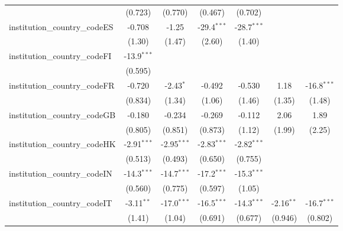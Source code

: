 \begin{tabular}{lcccccc}
                                         & (0.723)       & (0.770)       & (0.467)       & (0.702)       &               &   \\   
   institution\_country\_codeES          & -0.708        & -1.25         & -29.4$^{***}$ & -28.7$^{***}$ &               &   \\   
                                         & (1.30)        & (1.47)        & (2.60)        & (1.40)        &               &   \\   
   institution\_country\_codeFI          & -13.9$^{***}$ &               &               &               &               &   \\   
                                         & (0.595)       &               &               &               &               &   \\   
   institution\_country\_codeFR          & -0.720        & -2.43$^{*}$   & -0.492        & -0.530        & 1.18          & -16.8$^{***}$\\   
                                         & (0.834)       & (1.34)        & (1.06)        & (1.46)        & (1.35)        & (1.48)\\   
   institution\_country\_codeGB          & -0.180        & -0.234        & -0.269        & -0.112        & 2.06          & 1.89\\   
                                         & (0.805)       & (0.851)       & (0.873)       & (1.12)        & (1.99)        & (2.25)\\   
   institution\_country\_codeHK          & -2.91$^{***}$ & -2.95$^{***}$ & -2.83$^{***}$ & -2.82$^{***}$ &               &   \\   
                                         & (0.513)       & (0.493)       & (0.650)       & (0.755)       &               &   \\   
   institution\_country\_codeIN          & -14.3$^{***}$ & -14.7$^{***}$ & -17.2$^{***}$ & -15.3$^{***}$ &               &   \\   
                                         & (0.560)       & (0.775)       & (0.597)       & (1.05)        &               &   \\   
   institution\_country\_codeIT          & -3.11$^{**}$  & -17.0$^{***}$ & -16.5$^{***}$ & -14.3$^{***}$ & -2.16$^{**}$  & -16.7$^{***}$\\   
                                         & (1.41)        & (1.04)        & (0.691)       & (0.677)       & (0.946)       & (0.802)\\   

\end{tabular}
